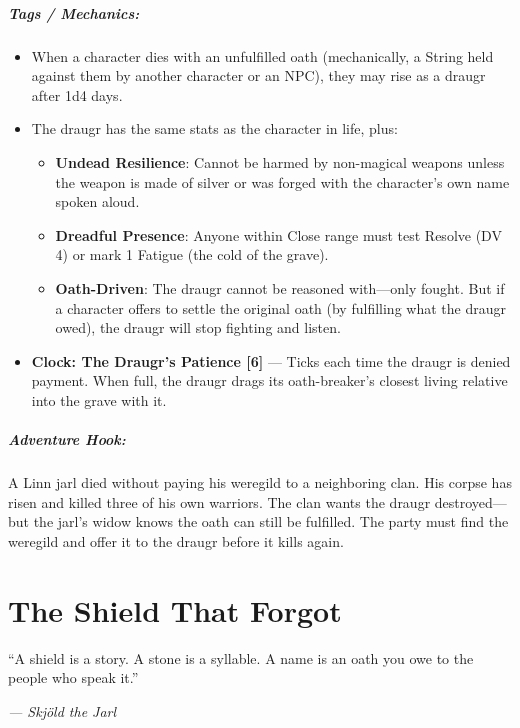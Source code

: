 \documentclass[9pt,a5paper]{extbook}
\begin{document}
\paragraph{Tags / Mechanics:}
\begin{itemize}
    \item When a character dies with an unfulfilled oath (mechanically, a String held against them by another character or an NPC), they may rise as a draugr after 1d4 days.
    \item The draugr has the same stats as the character in life, plus:
    \begin{itemize}
        \item \textbf{Undead Resilience}: Cannot be harmed by non-magical weapons unless the weapon is made of silver or was forged with the character's own name spoken aloud.
        \item \textbf{Dreadful Presence}: Anyone within Close range must test Resolve (DV 4) or mark 1 Fatigue (the cold of the grave).
        \item \textbf{Oath-Driven}: The draugr cannot be reasoned with---only fought. But if a character offers to settle the original oath (by fulfilling what the draugr owed), the draugr will stop fighting and listen.
    \end{itemize}
    \item \textbf{Clock: The Draugr's Patience [6]} --- Ticks each time the draugr is denied payment. When full, the draugr drags its oath-breaker's closest living relative into the grave with it.
\end{itemize}

\paragraph{Adventure Hook:}
A Linn jarl died without paying his weregild to a neighboring clan. His corpse has risen and killed three of his own warriors. The clan wants the draugr destroyed---but the jarl's widow knows the oath can still be fulfilled. The party must find the weregild and offer it to the draugr before it kills again.

\clearpage

\chapter{The Shield That Forgot}

\epigraph{``A shield is a story. A stone is a syllable. A name is an oath you owe to the people who speak it.''}{\textit{--- Skjöld the Jarl}}
\end{document}
